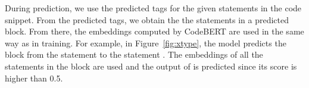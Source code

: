 During prediction, we use the predicted tags for the given statements
in the code snippet. From the predicted tags, we obtain the the
statements in a predicted  block. From there, the
embeddings computed by CodeBERT are used in the same way as in
training. For example, in Figure~\ref{fig:xtype}, the model predicts
the  block from the statement  to the
statement . The embeddings of all the
statements in the block are used and the output of 
is predicted since its score is higher than 0.5.








%
%
